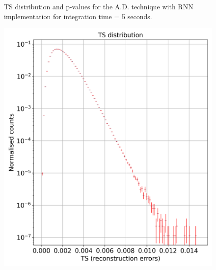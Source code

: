 \begin{figure}[!htb]
\begin{minipage}{0.5\textwidth}
    \end{minipage}
    \caption{TS distribution and p-values for the A.D. technique with RNN implementation for integration time = 5 seconds.}
    \label{fig:ts-distribution-and-p-values-rnn-it-5}
\end{figure}

\begin{figure}[!htb]
    \centering
    \begin{minipage}{0.5\textwidth}
        \centering
        \includegraphics[width=\linewidth]{figures/experiments/p_val/model_0/ts_distribution_bins_100.png}
    \end{minipage}%
    \begin{minipage}{0.5\textwidth}
        \centering

\end{minipage}
\end{figure}
